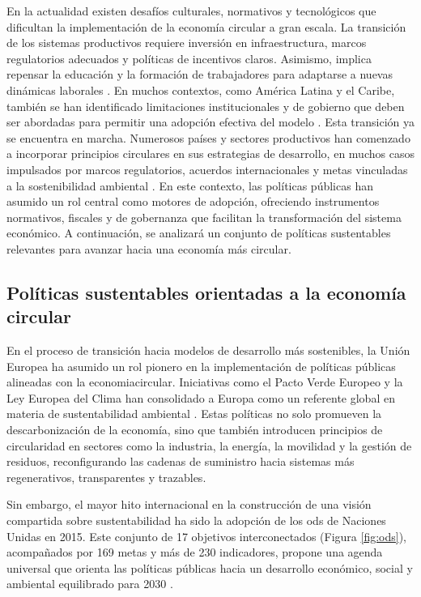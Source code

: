 En la actualidad existen desafíos culturales, normativos y tecnológicos que dificultan la implementación de la economía circular a gran escala. La transición de los sistemas productivos requiere inversión en infraestructura, marcos regulatorios adecuados y políticas de incentivos claros. Asimismo, implica repensar la educación y la formación de trabajadores para adaptarse a nuevas dinámicas laborales \cite{da2022economia}. En muchos contextos, como América Latina y el Caribe, también se han identificado limitaciones institucionales y de gobierno que deben ser abordadas para permitir una adopción efectiva del modelo \cite{cepal2021economia}. Esta transición ya se encuentra en marcha. Numerosos países y sectores productivos han comenzado a incorporar principios circulares en sus estrategias de desarrollo, en muchos casos impulsados por marcos regulatorios, acuerdos internacionales y metas vinculadas a la sostenibilidad ambiental \cite{da2022economia, cepal2021economia}. En este contexto, las políticas públicas han asumido un rol central como motores de adopción, ofreciendo instrumentos normativos, fiscales y de gobernanza que facilitan la transformación del sistema económico. A continuación, se analizará un conjunto de políticas sustentables relevantes para avanzar hacia una economía más circular.


\subsection{Políticas sustentables orientadas a la economía circular}

En el proceso de transición hacia modelos de desarrollo más sostenibles, la Unión Europea ha asumido un rol pionero en la implementación de políticas públicas alineadas con la \gls{economiacircular}. Iniciativas como el Pacto Verde Europeo y la Ley Europea del Clima han consolidado a Europa como un referente global en materia de sustentabilidad ambiental \cite{dormido2022cambio}. Estas políticas no solo promueven la descarbonización de la economía, sino que también introducen principios de circularidad en sectores como la industria, la energía, la movilidad y la gestión de residuos, reconfigurando las cadenas de suministro hacia sistemas más regenerativos, transparentes y trazables.

Sin embargo, el mayor hito internacional en la construcción de una visión compartida sobre sustentabilidad ha sido la adopción de los \acrfull{ods} de Naciones Unidas en 2015. Este conjunto de 17 objetivos interconectados (Figura \ref{fig:ods}), acompañados por 169 metas y más de 230 indicadores, propone una agenda universal que orienta las políticas públicas hacia un desarrollo económico, social y ambiental equilibrado para 2030 \cite{gil2018objetivos}.

